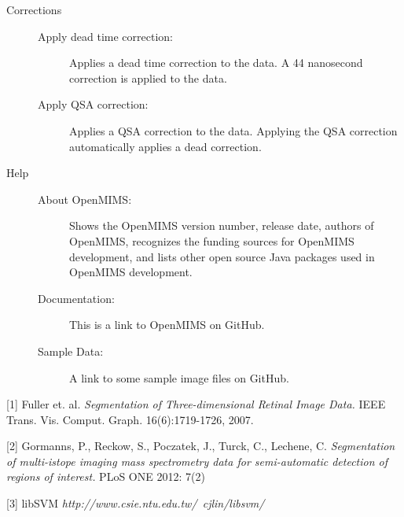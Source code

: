 \documentclass{article}
\begin{document}
\begin{description}
\begin{description}
	\end{description}
	
	
	
	\vspace{5mm}
	\item[\large{Corrections}] \indent                       
	
	\begin{description}
	
	\item[Apply dead time correction:] Applies a dead time correction to the data. A 44 nanosecond
	correction is applied to the data.
	
	\item[Apply QSA correction:] Applies a QSA correction to the data. Applying the QSA correction
	automatically applies a dead correction.
	
	\end{description}
	
	\vspace{5mm}
	\item[\large{Help}] \indent                       
	
	\begin{description}
	
	\item[About OpenMIMS:] Shows the OpenMIMS version number, release date, authors of OpenMIMS, recognizes the funding sources for OpenMIMS development, and lists other open source Java packages used in OpenMIMS development.
		
	\item[Documentation:] This is a link to OpenMIMS on GitHub.
	
	\item[Sample Data:] A link to some sample image files on GitHub.
	
	\end{description}
	
	
	\end{description}
	
	\vfill
	
	[1]  Fuller et. al. \textit{Segmentation of Three-dimensional Retinal Image Data.} 
	IEEE Trans. Vis. Comput. Graph. 16(6):1719-1726, 2007.

	[2] Gormanns, P., Reckow, S., Poczatek, J., Turck, C., Lechene, C. \textit{Segmentation of multi-istope imaging mass spectrometry data for semi-automatic detection of regions of interest.} PLoS ONE 2012: 7(2)

	[3] libSVM  \textit{http://www.csie.ntu.edu.tw/~cjlin/libsvm/}
	
\end{document}
